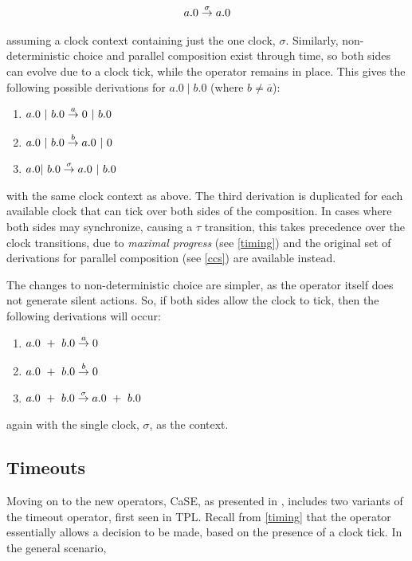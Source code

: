 \begin{equation}
a.0 \stackrel{\sigma}{\rightarrow} a.0
\end{equation}

\noindent assuming a clock context containing just the one clock,
$\sigma$. Similarly, non-deterministic choice and parallel composition
exist through time, so both sides can evolve due to a clock tick,
while the operator remains in place.  This gives the following
possible derivations for $a.0\;|\;b.0$ (where $b \ne \overline{a}$):

\begin{enumerate}
\item $a.0\ |\ b.0 \derives{a} 0\ |\ b.0$
\item $a.0\ |\ b.0 \derives{b} a.0\ |\ 0$
\item $a.0 |\ b.0 \derives{\sigma} a.0\ |\ b.0$
\end{enumerate}

\noindent with the same clock context as above.  The third derivation
is duplicated for each available clock that can tick over both sides
of the composition.  In cases where both sides may synchronize,
causing a $\tau$ transition, this takes precedence over the clock
transitions, due to \emph{maximal progress} (see \ref{timing}) and the
original set of derivations for parallel composition (see \ref{ccs})
are available instead.

The changes to non-deterministic choice are simpler, as the operator itself
does not generate silent actions.  So, if both sides allow the clock to tick,
then the following derivations will occur:

\begin{enumerate}
\item $a.0\ +\ b.0 \stackrel{a}{\rightarrow} 0$
\item $a.0\ +\ b.0 \stackrel{b}{\rightarrow} 0$
\item $a.0\ +\ b.0 \derives{\sigma} a.0\ +\ b.0$
\end{enumerate}

\noindent again with the single clock, $\sigma$, as the context.

\subsection{Timeouts}

Moving on to the new operators, CaSE, as presented in
\cite{norton05alg}, includes two variants of the timeout operator,
first seen in TPL.  Recall from \ref{timing} that the operator
essentially allows a decision to be made, based on the presence of a
clock tick.  In the general scenario,

